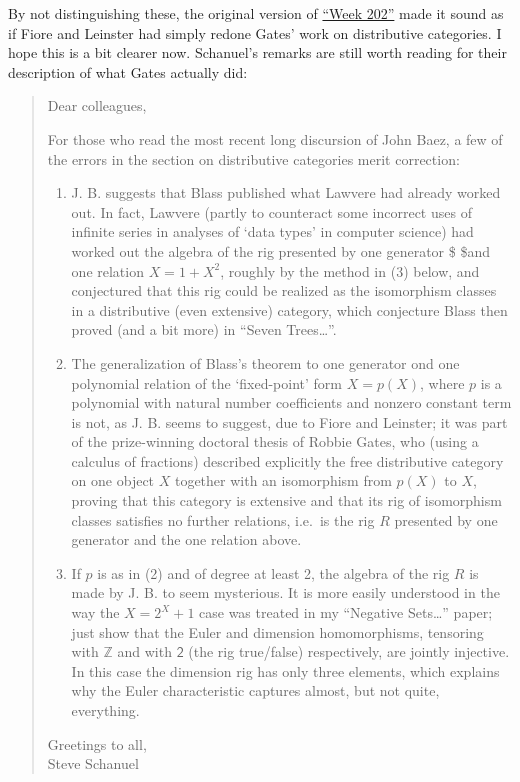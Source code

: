 \documentclass{article}
\begin{document}
By not distinguishing these, the original version of
\protect\hyperlink{week202}{``Week 202''} made it sound as if Fiore and
Leinster had simply redone Gates' work on distributive categories. I
hope this is a bit clearer now. Schanuel's remarks are still worth
reading for their description of what Gates actually did:

\begin{quote}
Dear colleagues,

For those who read the most recent long discursion of John Baez, a few
of the errors in the section on distributive categories merit
correction:

\begin{enumerate}
\def\labelenumi{(\arabic{enumi})}
\item
  J. B. suggests that Blass published what Lawvere had already worked
  out. In fact, Lawvere (partly to counteract some incorrect uses of
  infinite series in analyses of `data types' in computer science) had
  worked out the algebra of the rig presented by one generator \$ \$and
  one relation \(X=1+X^2\), roughly by the method in (3) below, and
  conjectured that this rig could be realized as the isomorphism classes
  in a distributive (even extensive) category, which conjecture Blass
  then proved (and a bit more) in ``Seven Trees\ldots{}''.
\item
  The generalization of Blass's theorem to one generator ond one
  polynomial relation of the `fixed-point' form \(X=p(X)\), where \(p\)
  is a polynomial with natural number coefficients and nonzero constant
  term is not, as J. B. seems to suggest, due to Fiore and Leinster; it
  was part of the prize-winning doctoral thesis of Robbie Gates, who
  (using a calculus of fractions) described explicitly the free
  distributive category on one object \(X\) together with an isomorphism
  from \(p(X)\) to \(X\), proving that this category is extensive and
  that its rig of isomorphism classes satisfies no further relations,
  i.e.~is the rig \(R\) presented by one generator and the one relation
  above.
\item
  If \(p\) is as in (2) and of degree at least 2, the algebra of the rig
  \(R\) is made by J. B. to seem mysterious. It is more easily
  understood in the way the \(X=2^X+1\) case was treated in my
  ``Negative Sets\ldots{}'' paper; just show that the Euler and
  dimension homomorphisms, tensoring with \(\mathbb{Z}\) and with
  \(\mathsf{2}\) (the rig true/false) respectively, are jointly
  injective. In this case the dimension rig has only three elements,
  which explains why the Euler characteristic captures almost, but not
  quite, everything.
\end{enumerate}

Greetings to all,\\
Steve Schanuel
\end{quote}
\end{document}
